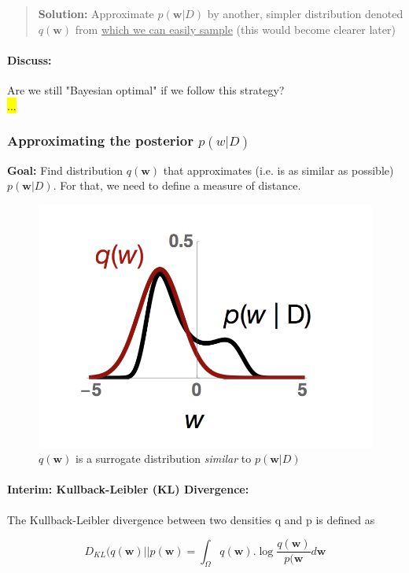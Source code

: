 \documentclass[main]{subfiles}
\begin{document}
\begin{quote}
    \textbf{Solution:} Approximate $p(\bm{w}|D)$ by another, simpler distribution denoted $q(\bm{w})$ from \underline{which we can easily sample} (this would become clearer later)
\end{quote}

\paragraph{Discuss:} Are we still "Bayesian optimal" if we follow this strategy?\\

\hl{...}


\subsubsection{Approximating the posterior $p(w|D)$}
\textbf{Goal:} Find distribution $q(\bm{w})$ that approximates (i.e. is as similar as possible) $p(\bm{w}|D)$. For that, we need to define a measure of distance.\\
\begin{figure}[H]
    	\centering
    	\includegraphics[width=0.6\linewidth]{05_LearningAsBayesianInference/figures/q_posterior.png}
    	\caption{$q(\bm{w})$ is a surrogate distribution \textit{similar} to $p(\bm{w}|D)$}
    	\label{fig:q_posterior}
    \end{figure}
\paragraph{Interim: Kullback-Leibler (KL) Divergence:}

The Kullback-Leibler divergence between two densities q and p is defined as

\begin{equation}
    D_{KL}(q(\bm{w})||p(\bm{w}) = \int_\Omega q(\bm{w}) . \log \frac{q(\bm{w})}{p(\bm{w}} d\bm{w}
    \label{eq:KL}
\end{equation}
\end{document}
